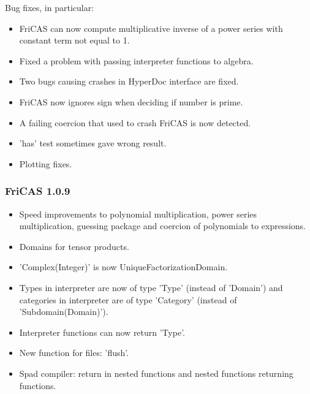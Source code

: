 Bug fixes, in particular:

\begin{itemize}
\item FriCAS can now compute multiplicative inverse of a power series
  with constant term not equal to 1.

\item Fixed a problem with passing interpreter functions to algebra.

\item Two bugs causing crashes in HyperDoc interface are fixed.

\item FriCAS now ignores sign when deciding if number is prime.

\item A failing coercion that used to crash FriCAS is now detected.

\item 'has' test sometimes gave wrong result.

\item Plotting fixes.
\end{itemize}

\subsubsection{FriCAS 1.0.9}

\begin{itemize}
\item Speed improvements to polynomial multiplication, power series
  multiplication, guessing package and coercion of polynomials to
  expressions.

\item Domains for tensor products.

\item 'Complex(Integer)' is now UniqueFactorizationDomain.

\item Types in interpreter are now of type 'Type' (instead of
  'Domain') and categories in interpreter are of type 'Category'
  (instead of 'Subdomain(Domain)').

\item Interpreter functions can now return 'Type'.

\item New function for files: 'flush'.

\item Spad compiler: return in nested functions and nested functions
  returning functions.
\end{itemize}


